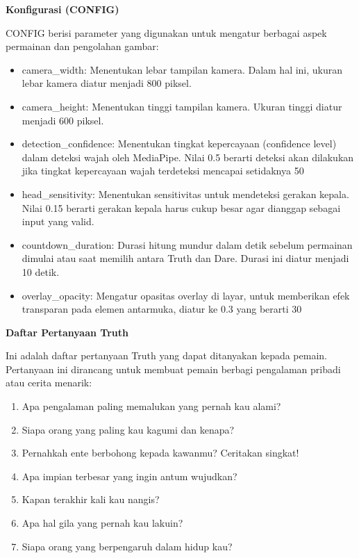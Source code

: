 \documentclass[11pt,a4paper]{article}
\begin{document}
\newpage
\textbf{Konfigurasi (CONFIG)}

CONFIG berisi parameter yang digunakan untuk mengatur berbagai aspek permainan dan pengolahan gambar:
\begin{itemize}
    \item camera\_width: Menentukan lebar tampilan kamera. Dalam hal ini, ukuran lebar kamera diatur menjadi 800 piksel.
    \item camera\_height: Menentukan tinggi tampilan kamera. Ukuran tinggi diatur menjadi 600 piksel.
    \item detection\_confidence: Menentukan tingkat kepercayaan (confidence level) dalam deteksi wajah oleh MediaPipe. Nilai 0.5 berarti deteksi akan dilakukan jika tingkat kepercayaan wajah terdeteksi mencapai setidaknya 50%
    \item head\_sensitivity: Menentukan sensitivitas untuk mendeteksi gerakan kepala. Nilai 0.15 berarti gerakan kepala harus cukup besar agar dianggap sebagai input yang valid.
    \item countdown\_duration: Durasi hitung mundur dalam detik sebelum permainan dimulai atau saat memilih antara Truth dan Dare. Durasi ini diatur menjadi 10 detik.
    \item overlay\_opacity: Mengatur opasitas overlay di layar, untuk memberikan efek transparan pada elemen antarmuka, diatur ke 0.3 yang berarti 30%
\end{itemize}

\textbf{Daftar Pertanyaan Truth}

Ini adalah daftar pertanyaan Truth yang dapat ditanyakan kepada pemain. Pertanyaan ini dirancang untuk membuat pemain berbagi pengalaman pribadi atau cerita menarik:
\begin{enumerate}
    \item Apa pengalaman paling memalukan yang pernah kau alami?
    \item Siapa orang yang paling kau kagumi dan kenapa?
    \item Pernahkah ente berbohong kepada kawanmu? Ceritakan singkat!
    \item Apa impian terbesar yang ingin antum wujudkan?
    \item Kapan terakhir kali kau nangis?
    \item Apa hal gila yang pernah kau lakuin?
    \item Siapa orang yang berpengaruh dalam hidup kau?
\end{enumerate}
\end{document}
